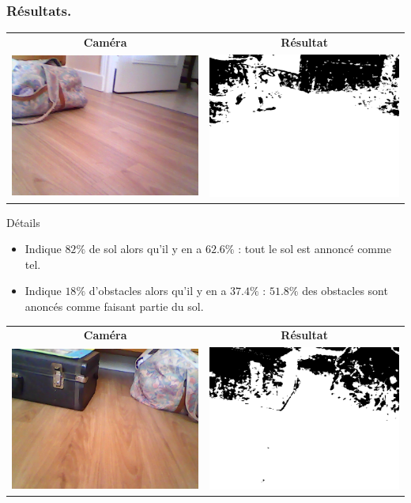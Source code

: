 \begin{frame}
    \frametitle{Résultats.}
    \begin{center}
         {
            \begin{tabular}{cc}
                \textbf{Caméra} & \textbf{Résultat} \\
                \includegraphics[width=0.4\linewidth]{rcs/abodr0s.png} & \includegraphics[width=0.4\linewidth]{rcs/abodr0r.png} \\
            \end{tabular}
            \begin{block}{Détails}
                \begin{itemize}
                    \item Indique $82\%$ de sol alors qu'il y en a $62.6\%$ : tout le sol est annoncé comme tel.
                    \item Indique $18\%$ d'obstacles alors qu'il y en a $37.4\%$ : $51.8\%$ des obstacles sont anoncés comme faisant partie du sol.
                \end{itemize}
            \end{block}
        }  {
            \begin{tabular}{cc}
                \textbf{Caméra} & \textbf{Résultat} \\
                \includegraphics[width=0.4\linewidth]{rcs/abodr1s.png} & \includegraphics[width=0.4\linewidth]{rcs/abodr1r.png} \\

\end{tabular}}
\end{center}
\end{frame}

